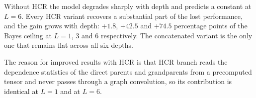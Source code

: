 Without HCR the model degrades sharply with depth and predicts a constant at
$L=6$. Every HCR variant recovers a substantial part of the lost performance,
and the gain grows with depth: $+1.8$, $+42.5$ and $+74.5$ percentage points
of the Bayes ceiling at $L=1$, $3$ and $6$ respectively. The concatenated
variant is the only one that remains flat across all six depths.

The reason for improved results with HCR is that HCR branch reads the
dependence statistics of the direct parents and grandparents from a precomputed tensor and
never passes through a graph convolution, so its contribution is identical at
$L=1$ and at $L=6$. 



